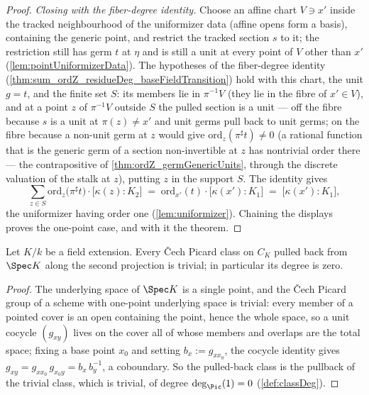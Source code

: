 \begin{proof}
  \emph{Closing with the fiber-degree identity.} Choose an affine chart
  \(V \ni x'\) inside the tracked neighbourhood of the uniformizer data (affine opens
  form a basis), containing the generic point, and restrict the tracked section
  \(s\) to it; the restriction still has germ \(t\) at \(\eta\) and is still a unit at
  every point of \(V\) other than \(x'\) (\ref{lem:pointUniformizerData}). The
  hypotheses of the fiber-degree identity
  (\ref{thm:sum_ordZ_residueDeg_baseFieldTransition}) hold with this chart, the unit
  \(g = t\), and the finite set \(S\): its members lie in
  \(\pi^{-1}V\) (they lie in the fibre of \(x' \in V\)), and at a point \(z\) of
  \(\pi^{-1}V\) outside \(S\) the pulled section is a unit --- off the fibre because
  \(s\) is a unit at \(\pi(z) \neq x'\) and unit germs pull back to unit germs; on the
  fibre because a non-unit germ at \(z\) would give
  \(\mathrm{ord}_z(\pi^{\sharp}t) \neq 0\) (a rational function that is the generic
  germ of a section non-invertible at \(z\) has nontrivial order there --- the
  contrapositive of \ref{thm:ordZ_germGenericUnits}, through the discrete valuation of
  the stalk at \(z\)), putting \(z\) in the support \(S\). The identity gives
  \[
    \sum_{z \in S} \mathrm{ord}_z\bigl(\pi^{\sharp}t\bigr) \cdot
      \bigl[\kappa(z) : K_2\bigr]
    \;=\; \mathrm{ord}_{x'}(t) \cdot \bigl[\kappa(x') : K_1\bigr]
    \;=\; \bigl[\kappa(x') : K_1\bigr],
  \]
  the uniformizer having order one (\ref{lem:uniformizer}). Chaining the displays
  proves the one-point case, and with it the theorem.
\end{proof}

\begin{lemma}
  \label{lem:classDeg_picFromBase}
  \leanok
  Let \(K/k\) be a field extension. Every \v Cech Picard class on \(C_K\) pulled back
  from \(\Spec K\) along the second projection is trivial; in particular its degree is
  zero.
\end{lemma}
\begin{proof}
  \leanok
  The underlying space of \(\Spec K\) is a single point, and the \v Cech Picard group
  of a scheme with one-point underlying space is trivial: every member of a pointed
  cover is an open containing the point, hence the whole space, so a unit cocycle
  \((g_{xy})\) lives on the cover all of whose members and overlaps are the total
  space; fixing a base point \(x_0\) and setting \(b_x := g_{x x_0}\), the cocycle
  identity gives \(g_{xy} = g_{x x_0}\, g_{x_0 y} = b_x\, b_y^{-1}\), a coboundary. So
  the pulled-back class is the pullback of the trivial class, which is trivial, of
  degree \(\deg_{\Pic}(1) = 0\) (\ref{def:classDeg}).
\end{proof}

